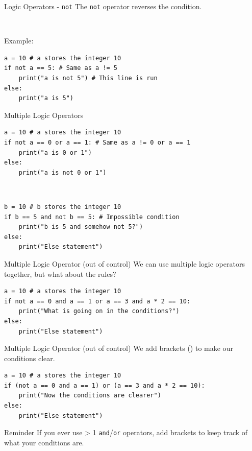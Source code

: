 \documentclass[dvipsnames, svgnames, x11names, handout]{beamer}
\begin{document}
\begin{frame}[fragile]{Logic Operators - \texttt{not}}
The \texttt{not} operator reverses the condition.

\

Example:
\begin{verbatim}
a = 10 # a stores the integer 10
if not a == 5: # Same as a != 5
    print("a is not 5") # This line is run
else:
    print("a is 5")
\end{verbatim}
\end{frame}

\begin{frame}[fragile]{Multiple Logic Operators}
\begin{verbatim}
a = 10 # a stores the integer 10
if not a == 0 or a == 1: # Same as a != 0 or a == 1
    print("a is 0 or 1")
else:
    print("a is not 0 or 1")
\end{verbatim}

\

\begin{verbatim}
b = 10 # b stores the integer 10
if b == 5 and not b == 5: # Impossible condition
    print("b is 5 and somehow not 5?")
else:
    print("Else statement")
\end{verbatim}
\end{frame}

\begin{frame}[fragile]{Multiple Logic Operator (out of control)}
We can use multiple logic operators together, but what about the rules?
\begin{verbatim}
a = 10 # a stores the integer 10
if not a == 0 and a == 1 or a == 3 and a * 2 == 10:
    print("What is going on in the conditions?")
else:
    print("Else statement")
\end{verbatim}
\end{frame}

\begin{frame}[fragile]{Multiple Logic Operator (out of control)}
We add brackets () to make our conditions clear.
\begin{verbatim}
a = 10 # a stores the integer 10
if (not a == 0 and a == 1) or (a == 3 and a * 2 == 10):
    print("Now the conditions are clearer")
else:
    print("Else statement")
\end{verbatim}
\pause
\begin{block}{Reminder}
If you ever use > 1 \texttt{and}/\texttt{or} operators, add brackets to keep track of what your conditions are.
\end{block}
\end{frame}
\end{document}
